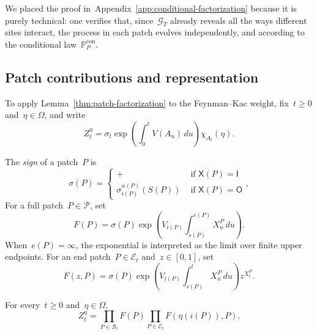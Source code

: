 \documentclass[EJP,preprint,NODS,nobera]{ejpecp}
\newcommand{\pP}{\mathbb{P}}
\newcommand{\bb}[1]{\left(#1\right)}
\newcommand{\pw}[4]{\left\{\begin{array}{cl}
  #1 &\text{ if } #2 \\
  #3 &\text{ if } #4
\end{array}\right.}
\newcommand{\rev}[1]{{\color{red}#1}}
\begin{document}
We placed the proof in~Appendix~\ref{app:conditional-factorization} because it is purely technical: one verifies that, since~$\mathcal{G}_T$ already reveals all the ways different sites interact, the process in each patch evolves independently, and according to the conditional law~$\pP_P^{\operatorname{con}}$.

\subsection{\texorpdfstring{\rev{Patch contributions and representation}}{Patch contributions and representation}}
\label{subsec:patch-representation}

To apply Lemma~\ref{thm:patch-factorization} to the Feynman--Kac weight,
fix~$t\geq0$ and~$\eta\in\Omega$, and write
\begin{equation*}
Z_t^\eta
=
\sigma_t
\exp\bb{\int_0^tV(A_u)\,du}
\chi_{A_t}(\eta).
\end{equation*}

\begin{definition}
\label{def:patch-weights}
The \emph{sign} of a patch~$P$ is
\begin{equation*}
\sigma(P)
=
\pw{+}{\mathsf X(P)=\mathsf I}
{\sigma_{i(P)}^{\alpha(P)}\bb{S(P)}}{\mathsf X(P)=\mathsf O},
\end{equation*}
For a full patch~$P\in\mathcal P$, set
\begin{equation*}
F(P)
=
\sigma(P)
\exp\bb{
V_{i(P)}\int_{s(P)}^{e(P)}X_u^P\,du
}.
\end{equation*}
When~$e(P)=\infty$, the exponential is interpreted as the limit over finite
upper endpoints. For an end patch~$P\in\mathcal E_t$ and~$z\in[0,1]$, set
\begin{equation*}
F(z,P)
=
\sigma(P)
\exp\bb{
V_{i(P)}\int_{s(P)}^tX_u^P\,du
}
z^{X_t^P}.
\end{equation*}
\end{definition}

\begin{lemma}
\label{lem:pathwise-factorization}
For every~$t\geq0$ and~$\eta\in\Omega$,
\begin{equation}
\label{eq:pathwise-patch-factorization}
Z_t^\eta
=
\prod_{P\in\mathcal B_t}F(P)
\prod_{P\in\mathcal E_t}F\bb{\eta\bb{i(P)},P}.
\end{equation}
\end{lemma}
\end{document}
